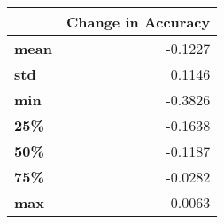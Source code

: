 \begin{tabular}{lr}
\toprule
{} &  Change in Accuracy \\
\midrule
\textbf{mean} &             -0.1227 \\
\textbf{std } &              0.1146 \\
\textbf{min } &             -0.3826 \\
\textbf{25\% } &             -0.1638 \\
\textbf{50\% } &             -0.1187 \\
\textbf{75\% } &             -0.0282 \\
\textbf{max } &             -0.0063 \\
\bottomrule
\end{tabular}
